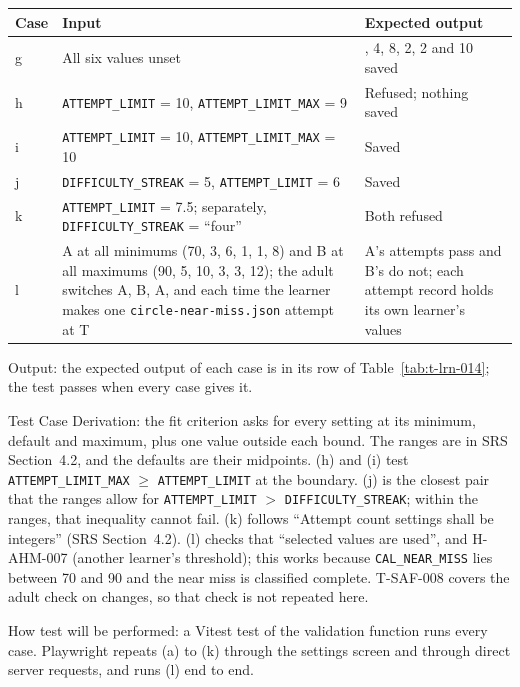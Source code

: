 \documentclass[12pt, titlepage]{article}
\begin{document}
\begin{enumerate}
\begin{table}[htbp]
\medskip
\begin{tabularx}{\textwidth}{@{}l >{\raggedright\arraybackslash}X
  >{\raggedright\arraybackslash}X@{}}
\toprule
\textbf{Case} & \textbf{Input} & \textbf{Expected output}\\
\midrule
g & All six values unset & 80, 4, 8, 2, 2 and 10 saved\\
h & \texttt{ATTEMPT\_LIMIT} = 10, \texttt{ATTEMPT\_LIMIT\_MAX} = 9 &
Refused; nothing saved\\
i & \texttt{ATTEMPT\_LIMIT} = 10, \texttt{ATTEMPT\_LIMIT\_MAX} = 10 &
Saved\\
j & \texttt{DIFFICULTY\_STREAK} = 5, \texttt{ATTEMPT\_LIMIT} = 6 & Saved\\
k & \texttt{ATTEMPT\_LIMIT} = 7.5; separately,
\texttt{DIFFICULTY\_STREAK} = ``four'' & Both refused\\
l & A at all minimums (70, 3, 6, 1, 1, 8) and B at all maximums (90, 5, 10,
3, 3, 12); the adult switches A, B, A, and each time the learner makes one
\texttt{circle-\allowbreak{}near-\allowbreak{}miss.json} attempt at T & A's
attempts pass and B's do not; each attempt record holds its own learner's
values\\
\bottomrule
\end{tabularx}
\end{table}

Output: the expected output of each case is in its row of
Table~\ref{tab:t-lrn-014}; the test passes when every case gives it.

Test Case Derivation: the fit criterion asks for every setting at its
minimum, default and maximum, plus one value outside each bound. The ranges
are in SRS Section~4.2, and the defaults are their midpoints. (h) and (i)
test \texttt{ATTEMPT\_LIMIT\_MAX} $\ge$ \texttt{ATTEMPT\_LIMIT} at the
boundary. (j) is the closest pair that the ranges allow for
\texttt{ATTEMPT\_LIMIT} $>$ \texttt{DIFFICULTY\_STREAK}; within the ranges,
that inequality cannot fail. (k) follows ``Attempt count settings shall be
integers'' (SRS Section~4.2). (l) checks that ``selected values are used'',
and H-AHM-007 (another learner's threshold); this works because
\texttt{CAL\_NEAR\_MISS} lies between 70 and 90 and the near miss is
classified complete. T-SAF-008 covers the
adult check on changes, so that check is not repeated here.

How test will be performed: a Vitest test of the validation function runs
every case. Playwright repeats (a) to (k) through the settings screen and
through direct server requests, and runs (l) end to end.


\end{enumerate}
\end{document}
